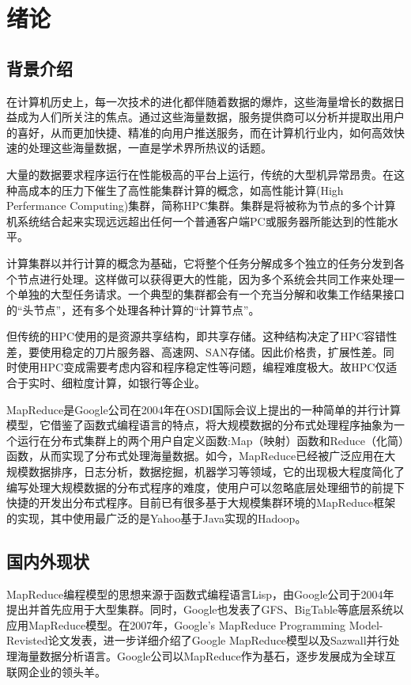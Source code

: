 \chapter{绪论}
\label{chap:1}

\section{背景介绍}

在计算机历史上，每一次技术的进化都伴随着数据的爆炸，这些海量增长的数据日益成为人们所关注的焦点。通过这些海量数据，服务提供商可以分析并提取出用户的喜好，从而更加快捷、精准的向用户推送服务，而在计算机行业内，如何高效快速的处理这些海量数据，一直是学术界所热议的话题。

大量的数据要求程序运行在性能极高的平台上运行，传统的大型机异常昂贵。在这种高成本的压力下催生了高性能集群计算的概念，如高性能计算(High Perfermance Computing)集群，简称HPC集群。集群是将被称为节点的多个计算机系统结合起来实现远远超出任何一个普通客户端PC或服务器所能达到的性能水平。

计算集群以并行计算的概念为基础，它将整个任务分解成多个独立的任务分发到各个节点进行处理。这样做可以获得更大的性能，因为多个系统会共同工作来处理一个单独的大型任务请求。一个典型的集群都会有一个充当分解和收集工作结果接口的“头节点”，还有多个处理各种计算的“计算节点”。

但传统的HPC使用的是资源共享结构，即共享存储。这种结构决定了HPC容错性差，要使用稳定的刀片服务器、高速网、SAN存储。因此价格贵，扩展性差。同时使用HPC变成需要考虑内容和程序稳定性等问题，编程难度极大。故HPC仅适合于实时、细粒度计算，如银行等企业。

MapReduce是Google公司在2004年在OSDI国际会议上提出的一种简单的并行计算模型，它借鉴了函数式编程语言的特点，将大规模数据的分布式处理程序抽象为一个运行在分布式集群上的两个用户自定义函数:Map（映射）函数和Reduce（化简）函数，从而实现了分布式处理海量数据。如今，MapReduce已经被广泛应用在大规模数据排序，日志分析，数据挖掘，机器学习等领域，它的出现极大程度简化了编写处理大规模数据的分布式程序的难度，使用户可以忽略底层处理细节的前提下快捷的开发出分布式程序。目前已有很多基于大规模集群环境的MapReduce框架的实现，其中使用最广泛的是Yahoo基于Java实现的Hadoop。

\section{国内外现状}
MapReduce编程模型的思想来源于函数式编程语言Lisp，由Google公司于2004年提出并首先应用于大型集群。同时，Google也发表了GFS、BigTable等底层系统以应用MapReduce模型。在2007年，Google’s MapReduce Programming Model-Revisted论文发表，进一步详细介绍了Google MapReduce模型以及Sazwall并行处理海量数据分析语言。Google公司以MapReduce作为基石，逐步发展成为全球互联网企业的领头羊。

